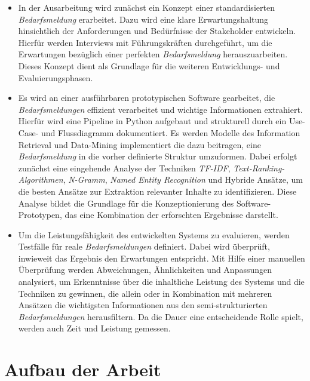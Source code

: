 \begin{itemize}
	\item In der Ausarbeitung wird zunächst ein Konzept einer standardisierten \emph{Bedarfsmeldung} erarbeitet. Dazu wird eine klare Erwartungshaltung hinsichtlich der Anforderungen und Bedürfnisse der Stakeholder entwickeln. Hierfür werden Interviews mit Führungskräften durchgeführt, um die Erwartungen bezüglich einer \glqq{}perfekten\grqq{} \emph{Bedarfsmeldung} herauszuarbeiten. Dieses Konzept dient als Grundlage für die weiteren Entwicklungs- und Evaluierungsphasen.
	\item Es wird an einer ausführbaren prototypischen Software gearbeitet, die \emph{Bedarfsmeldungen} effizient verarbeitet und wichtige Informationen extrahiert. Hierfür wird eine Pipeline in Python aufgebaut und strukturell durch ein Use-Case- und Flussdiagramm dokumentiert. Es werden Modelle des Information Retrieval und Data-Mining implementiert die dazu beitragen, eine \emph{Bedarfsmeldung} in die vorher definierte Struktur umzuformen. Dabei erfolgt zunächst eine eingehende Analyse der Techniken \emph{TF-IDF}, \emph{Text-Ranking-Algorithmen}, \emph{N-Gramm}, \emph{Named Entity Recognition} und Hybride Ansätze, um die besten Ansätze zur Extraktion relevanter Inhalte zu identifizieren. Diese Analyse bildet die Grundlage für die Konzeptionierung des Software-Prototypen, das eine Kombination der erforschten Ergebnisse darstellt.
	\item Um die Leistungsfähigkeit des entwickelten Systems zu evaluieren, werden Testfälle für reale \emph{Bedarfsmeldungen} definiert. Dabei wird überprüft, inwieweit das Ergebnis den Erwartungen entspricht. Mit Hilfe einer manuellen Überprüfung werden Abweichungen, Ähnlichkeiten und Anpassungen analysiert, um Erkenntnisse über die inhaltliche Leistung des Systems und die Techniken zu gewinnen, die allein oder in Kombination mit mehreren Ansätzen die wichtigsten Informationen aus den semi-strukturierten \emph{Bedarfsmeldungen} herausfiltern. Da die Dauer eine entscheidende Rolle spielt, werden auch Zeit und Leistung gemessen. %
\end{itemize}
\section{Aufbau der Arbeit}
\\

